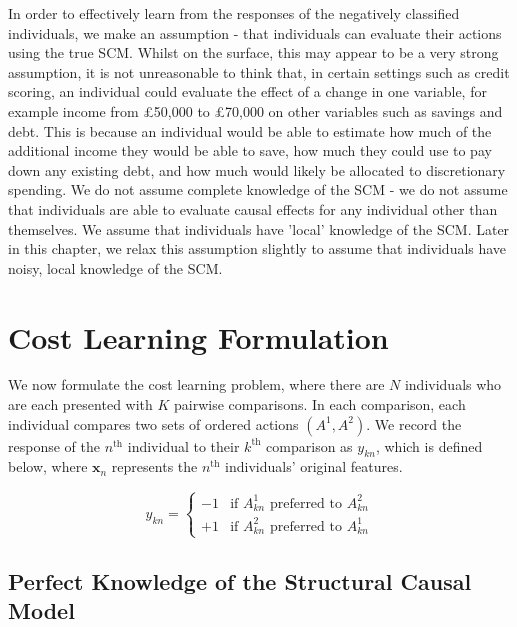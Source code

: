 In order to effectively learn from the responses of the negatively classified individuals, we make an assumption - that individuals can evaluate their actions using the true SCM. Whilst on the surface, this may appear to be a very strong assumption, it is not unreasonable to think that, in certain settings such as credit scoring, an individual could evaluate the effect of a change in one variable, for example income from £50,000 to £70,000 on other variables such as savings and debt. This is because an individual would be able to estimate how much of the additional income they would be able to save, how much they could use to pay down any existing debt, and how much would likely be allocated to discretionary spending. We do not assume complete knowledge of the SCM - we do not assume that individuals are able to evaluate causal effects for any individual other than themselves. We assume that individuals have 'local' knowledge of the SCM. Later in this chapter, we relax this assumption slightly to assume that individuals have noisy, local knowledge of the SCM.

\section{Cost Learning Formulation} \label{section:cost_learning_formulation}

We now formulate the cost learning problem, where there are $N$ individuals who are each presented with $K$ pairwise comparisons. In each comparison, each individual compares two sets of ordered actions $(A^1, A^2)$. We record the response of the $n^{\text{th}}$ individual to their $k^{\text{th}}$ comparison as $y_{kn}$, which is defined below, where $\mathbf{x}_n$ represents the $n^{\text{th}}$ individuals' original features.



\begin{equation} \label{eq:paired_response}
	y_{kn} = \begin{cases}
		-1 & \text{if } A^1_{kn} \text{ preferred to } A^2_{kn} \\
		+1 & \text{if } A^2_{kn} \text{ preferred to } A^1_{kn}
	\end{cases}
\end{equation}



\subsection{Perfect Knowledge of the Structural Causal Model}

